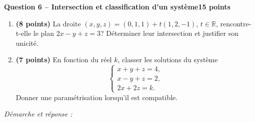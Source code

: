 \documentclass[11pt,a4paper]{article}
\begin{document}
\newpage
{\large\bfseries Question 6 -- Intersection et classification d’un système}\hfill\textbf{15 points}\par
\begin{enumerate}
\item \textbf{(8 points)} La droite \((x,y,z)=(0,1,1)+t(1,2,-1)\), \(t\in\mathbb R\), rencontre-t-elle le plan \(2x-y+z=3\)? Déterminer leur intersection et justifier son unicité.
\item \textbf{(7 points)} En fonction du réel \(k\), classer les solutions du système \[\begin{cases}x+y+z=4,\\x-y+z=2,\\2x+2z=k.\end{cases}\] Donner une paramétrisation lorsqu’il est compatible.
\end{enumerate}
\vspace{3mm}\textit{Démarche et réponse :}\par\vfill
\end{document}
